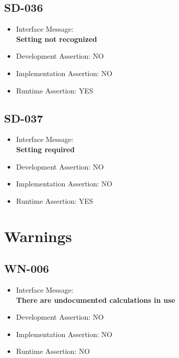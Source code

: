 \subsection{SD-036}
\begin{itemize}
  \item Interface Message:\\[1em]\textbf{Setting not recognized}
  \item Development Assertion: NO
  \item Implementation Assertion: NO
  \item Runtime Assertion: YES
\end{itemize}

\subsection{SD-037}
\begin{itemize}
  \item Interface Message:\\[1em]\textbf{Setting required}
  \item Development Assertion: NO
  \item Implementation Assertion: NO
  \item Runtime Assertion: YES
\end{itemize}

\section{Warnings}

\subsection{WN-006}
\begin{itemize}
  \item Interface Message:\\[1em]\textbf{There are undocumented calculations in use}
  \item Development Assertion: NO
  \item Implementation Assertion: NO
  \item Runtime Assertion: NO
\end{itemize}

